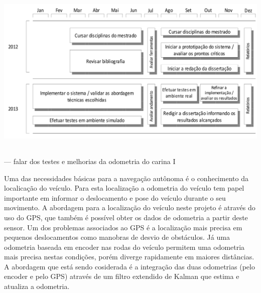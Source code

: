 \documentclass{article}
\begin{document}
\includegraphics[width=16cm,height=8cm]{images/chrono.png}

--- falar dos testes e melhorias da odometria do carina I

Uma das necessidades básicas para a navegação autônoma é o conhecimento da
localicação do veículo. Para esta localização a odometria do veículo tem papel
importante em informar o deslocamento e pose do veículo durante o seu movimento.
A abordagem para a localização do veículo neste projeto é através do uso do GPS,
que também é possível obter os dados de odometria a partir deste sensor. Um dos
problemas associados ao GPS é a localização mais precisa em pequenos
deslocamentos como manobras de desvio de obstáculos. Já uma odometria baseada em
encoder nas rodas do veículo permitem uma odometria mais precisa nestas
condições, porém diverge rapidamente em maiores distâncias. A abordagem que está
sendo cosiderada é a integração das duas odometrias (pelo encoder e pelo GPS)
através de um filtro extendido de Kalman que estima e atualiza a odometria.
\end{document}
